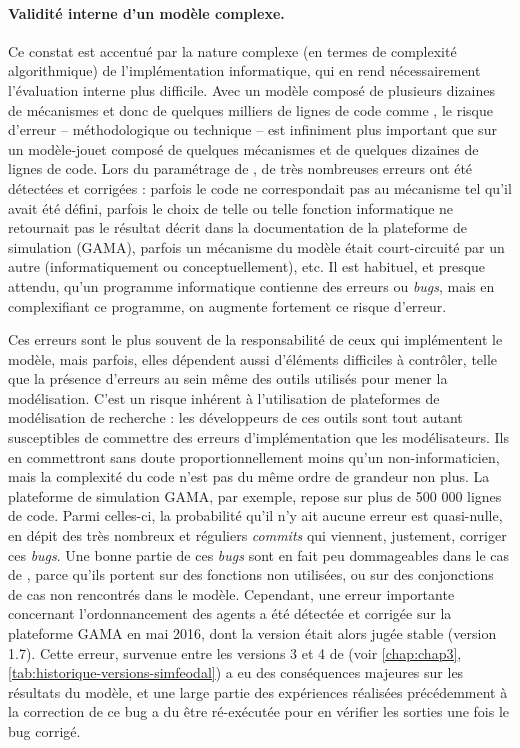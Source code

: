 \paragraph{Validité interne d'un modèle complexe.}
Ce constat est accentué par la nature complexe (en termes de complexité algorithmique) de l'implémentation informatique, qui en rend nécessairement l'évaluation interne plus difficile.
Avec un modèle composé de plusieurs dizaines de mécanismes et donc de quelques milliers de lignes de code comme \simfeodal{}, le risque d'erreur -- méthodologique ou technique -- est infiniment plus important que sur un modèle-jouet composé de quelques mécanismes et de quelques dizaines de lignes de code.
Lors du paramétrage de \simfeodal{}, de très nombreuses erreurs ont été détectées et corrigées :
	parfois le code ne correspondait pas au mécanisme tel qu'il avait été défini, parfois le choix de telle ou telle fonction informatique ne retournait pas le résultat décrit dans la documentation de la plateforme de simulation (GAMA), parfois un mécanisme du modèle était court-circuité par un autre (informatiquement ou conceptuellement), etc.
Il est habituel, et presque attendu, qu'un programme informatique contienne des erreurs ou \textit{bugs}, mais en complexifiant ce programme, on augmente fortement ce risque d'erreur.


Ces erreurs sont le plus souvent de la responsabilité de ceux qui implémentent le modèle, mais parfois, elles dépendent aussi d'éléments difficiles à contrôler, telle que la présence d'erreurs au sein même des outils utilisés pour mener la modélisation.
C'est un risque inhérent à l'utilisation de plateformes de modélisation \og de recherche\fg{} :
	les développeurs de ces outils sont tout autant susceptibles de commettre des erreurs d'implémentation que les modélisateurs.
Ils en commettront sans doute proportionnellement moins qu'un non-informaticien, mais la complexité du code n'est pas du même ordre de grandeur non plus.
La plateforme de simulation GAMA, par exemple, repose sur plus de 500 000 lignes de code.
Parmi celles-ci, la probabilité qu'il n'y ait aucune erreur est quasi-nulle, en dépit des très nombreux et réguliers \textit{commits} qui viennent, justement, corriger ces \textit{bugs}.
Une bonne partie de ces \textit{bugs} sont en fait peu dommageables dans le cas de \simfeodal{}, parce qu'ils portent sur des fonctions non utilisées, ou sur des conjonctions de cas non rencontrés dans le modèle.
Cependant, une erreur importante concernant l'ordonnancement des agents a été détectée et corrigée sur la plateforme GAMA en mai 2016, dont la version était alors jugée stable (version 1.7).
Cette erreur, survenue entre les versions 3 et 4 de \simfeodal{} (voir \cref{chap:chap3}, \cref{tab:historique-versions-simfeodal}) a eu des conséquences majeures sur les résultats du modèle, et une large partie des expériences réalisées précédemment à la correction de ce bug a du être ré-exécutée pour en vérifier les sorties une fois le bug corrigé.

